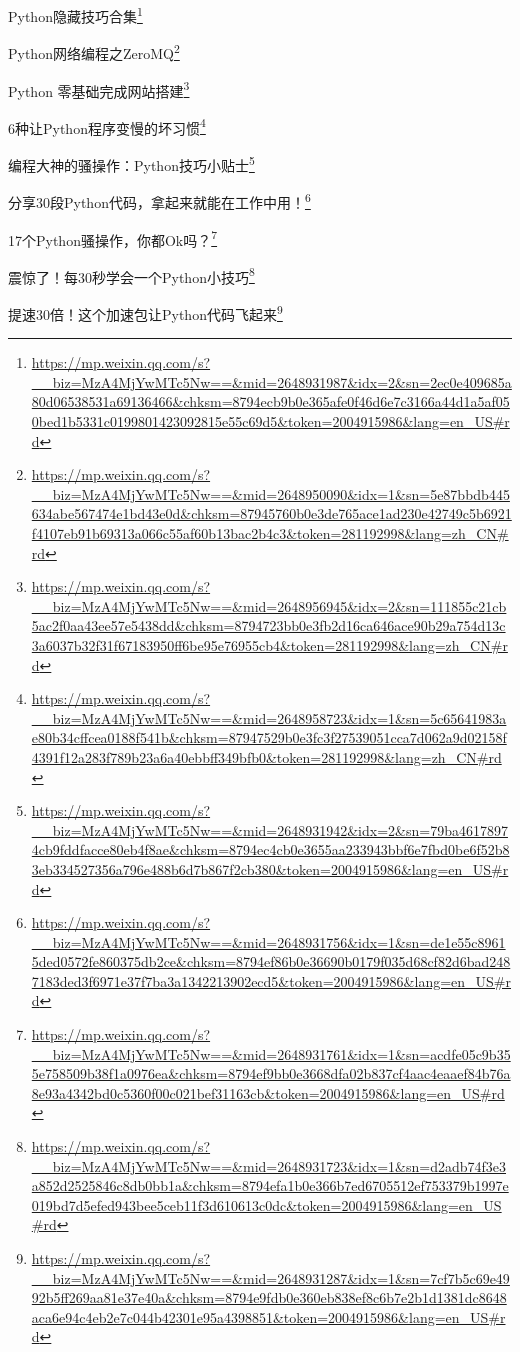 \documentclass[]{ctexbook}
\renewcommand{\href}[2]{#2\footnote{\url{#1}}}
\begin{document}
\href{https://mp.weixin.qq.com/s?__biz=MzA4MjYwMTc5Nw==\&mid=2648931987\&idx=2\&sn=2ec0e409685a80d06538531a69136466\&chksm=8794ecb9b0e365afe0f46d6e7c3166a44d1a5af050bed1b5331c0199801423092815e55c69d5\&token=2004915986\&lang=en_US\#rd}{Python隐藏技巧合集}

\href{https://mp.weixin.qq.com/s?__biz=MzA4MjYwMTc5Nw==\&mid=2648950090\&idx=1\&sn=5e87bbdb445634abe567474e1bd43e0d\&chksm=87945760b0e3de765ace1ad230e42749c5b6921f4107eb91b69313a066c55af60b13bac2b4c3\&token=281192998\&lang=zh_CN\#rd}{Python网络编程之ZeroMQ}

\href{https://mp.weixin.qq.com/s?__biz=MzA4MjYwMTc5Nw==\&mid=2648956945\&idx=2\&sn=111855c21cb5ac2f0aa43ee57e5438dd\&chksm=8794723bb0e3fb2d16ca646ace90b29a754d13c3a6037b32f31f67183950ff6be95e76955cb4\&token=281192998\&lang=zh_CN\#rd}{Python 零基础完成网站搭建}

\href{https://mp.weixin.qq.com/s?__biz=MzA4MjYwMTc5Nw==\&mid=2648958723\&idx=1\&sn=5c65641983ae80b34cffcea0188f541b\&chksm=87947529b0e3fc3f27539051cca7d062a9d02158f4391f12a283f789b23a6a40ebbff349bfb0\&token=281192998\&lang=zh_CN\#rd}{6种让Python程序变慢的坏习惯}

\href{https://mp.weixin.qq.com/s?__biz=MzA4MjYwMTc5Nw==\&mid=2648931942\&idx=2\&sn=79ba46178974cb9fddfacce80eb4f8ae\&chksm=8794ec4cb0e3655aa233943bbf6e7fbd0be6f52b83eb334527356a796e488b6d7b867f2cb380\&token=2004915986\&lang=en_US\#rd}{编程大神的骚操作：Python技巧小贴士}

\href{https://mp.weixin.qq.com/s?__biz=MzA4MjYwMTc5Nw==\&mid=2648931756\&idx=1\&sn=de1e55c89615ded0572fe860375db2ce\&chksm=8794ef86b0e36690b0179f035d68cf82d6bad2487183ded3f6971e37f7ba3a1342213902ecd5\&token=2004915986\&lang=en_US\#rd}{分享30段Python代码，拿起来就能在工作中用！}

\href{https://mp.weixin.qq.com/s?__biz=MzA4MjYwMTc5Nw==\&mid=2648931761\&idx=1\&sn=acdfe05c9b355e758509b38f1a0976ea\&chksm=8794ef9bb0e3668dfa02b837cf4aac4eaaef84b76a8e93a4342bd0c5360f00c021bef31163cb\&token=2004915986\&lang=en_US\#rd}{17个Python骚操作，你都Ok吗？}

\href{https://mp.weixin.qq.com/s?__biz=MzA4MjYwMTc5Nw==\&mid=2648931723\&idx=1\&sn=d2adb74f3e3a852d2525846c8db0bb1a\&chksm=8794efa1b0e366b7ed6705512ef753379b1997e019bd7d5efed943bee5ceb11f3d610613c0dc\&token=2004915986\&lang=en_US\#rd}{震惊了！每30秒学会一个Python小技巧}

\href{https://mp.weixin.qq.com/s?__biz=MzA4MjYwMTc5Nw==\&mid=2648931287\&idx=1\&sn=7cf7b5c69e4992b5ff269aa81e37e40a\&chksm=8794e9fdb0e360eb838ef8c6b7e2b1d1381dc8648aca6e94c4eb2e7c044b42301e95a4398851\&token=2004915986\&lang=en_US\#rd}{提速30倍！这个加速包让Python代码飞起来}
\end{document}
